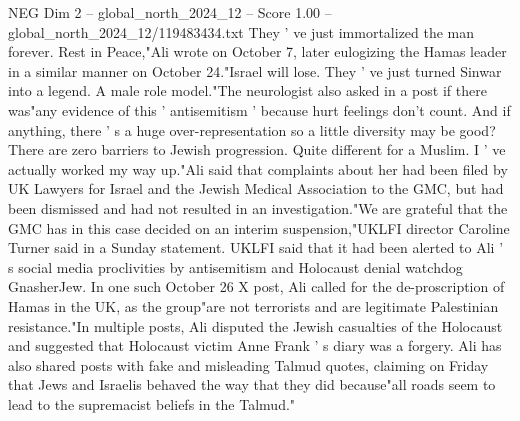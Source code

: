 \begin{textsample}{NEG Dim 2 – global\_north\_2024\_12 – Score 1.00 – global\_north\_2024\_12/119483434.txt}
They ' ve just immortalized the man forever.
Rest in Peace,"Ali wrote on October 7, later eulogizing the Hamas leader in a similar manner on October 24."Israel will lose.
They ' ve just turned Sinwar into a legend.
A male role model."The neurologist also asked in a post if there was"any evidence of this ' antisemitism ' because hurt feelings don't count.
And if anything, there ' s a huge over-representation so a little diversity may be good?
There are zero barriers to Jewish progression.
Quite different for a Muslim.
I ' ve actually worked my way up."Ali said that complaints about her had been filed by UK Lawyers for Israel and the Jewish Medical Association to the GMC, but had been dismissed and had not resulted in an investigation."We are grateful that the GMC has in this case decided on an interim suspension,"UKLFI director Caroline Turner said in a Sunday statement.
UKLFI said that it had been alerted to Ali ' s social media proclivities by antisemitism and Holocaust denial watchdog GnasherJew.
In one such October 26 X post, Ali called for the de-proscription of Hamas in the UK, as the group"are not terrorists and are legitimate Palestinian resistance."In multiple posts, Ali disputed the Jewish casualties of the Holocaust and suggested that Holocaust victim Anne Frank ' s diary was a forgery.
Ali has also shared posts with fake and misleading Talmud quotes, claiming on Friday that Jews and Israelis behaved the way that they did because"all roads seem to lead to the supremacist beliefs in the Talmud."

\end{textsample}
